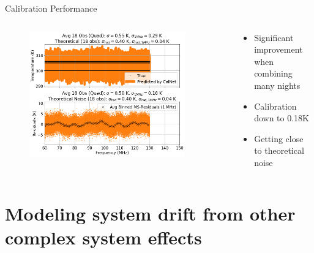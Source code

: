 \documentclass[aspectratio=169]{beamer}
\begin{document}
\begin{frame}{\small{Calibration Performance}}
	\begin{columns}[c]
		\begin{column}{0.6\textwidth}
			\begin{figure}
				\centering
				\includegraphics[width=0.9\textwidth]{images/pasted_image_20250515095127.png}
			\end{figure}
		\end{column}
		\begin{column}{0.4\textwidth}
			\begin{itemize}
				\item Significant improvement when combining many nights
				\item Calibration down to 0.18K
				\item Getting close to theoretical noise
			\end{itemize}
		\end{column}
	\end{columns}
\end{frame}

\section{Modeling system drift from other complex system effects}
\end{document}
